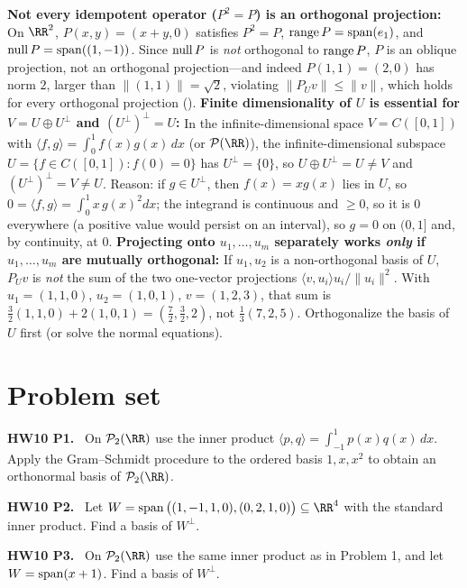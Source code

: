 \documentclass[10pt]{scrartcl}
\newcommand{\ip}[2]{\langle #1,#2\rangle}
\begin{document}
\begin{trapbox}
  \ii \textbf{Not every idempotent operator ($P^2=P$) is an orthogonal projection:} On $\RR^2$, $P(x,y)=(x+y,0)$ satisfies $P^2=P$, $\operatorname{range} P=\operatorname{span}(e_1)$, and $\operatorname{null} P=\operatorname{span}((1,-1))$. Since $\operatorname{null} P$ is \emph{not} orthogonal to $\operatorname{range} P$, $P$ is an oblique projection, not an orthogonal projection---and indeed $P(1,1)=(2,0)$ has norm $2$, larger than $\|(1,1)\|=\sqrt2$, violating $\|P_U v\|\le\|v\|$, which holds for every orthogonal projection ().
  \ii \textbf{Finite dimensionality of $U$ is essential for $V=U\oplus U^\perp$ and $(U^\perp)^\perp=U$:} In the infinite-dimensional space $V=C([0,1])$ with $\ip fg=\int_0^1 f(x)g(x)\,dx$ (or $\PP(\RR)$), the infinite-dimensional subspace $U=\{f\in C([0,1]):f(0)=0\}$ has $U^\perp=\{0\}$, so $U\oplus U^\perp=U\ne V$ and $(U^\perp)^\perp=V\ne U$. Reason: if $g\in U^\perp$, then $f(x)=xg(x)$ lies in $U$, so $0=\ip fg=\int_0^1x\,g(x)^2dx$; the integrand is continuous and $\ge0$, so it is $0$ everywhere (a positive value would persist on an interval), so $g=0$ on $(0,1]$ and, by continuity, at $0$.
  \ii \textbf{Projecting onto $u_1,\dots,u_m$ separately works \emph{only} if $u_1,\dots,u_m$ are mutually orthogonal:} If $u_1,u_2$ is a non-orthogonal basis of $U$, $P_U v$ is \emph{not} the sum of the two one-vector projections $\ip v{u_i}u_i/\|u_i\|^2$. With $u_1=(1,1,0)$, $u_2=(1,0,1)$, $v=(1,2,3)$, that sum is $\frac32(1,1,0)+2(1,0,1)=(\frac72,\frac32,2)$, not $\frac13(7,2,5)$. Orthogonalize the basis of $U$ first (or solve the normal equations).
\end{trapbox}

\section{Problem set}

\begin{prob}
\textbf{HW10 P1. }\ On $\PP_2(\RR)$ use the inner product $\ip pq=\int_{-1}^1p(x)q(x)\,dx$. Apply the Gram--Schmidt procedure to the ordered basis $1,x,x^2$ to obtain an orthonormal basis of $\PP_2(\RR)$.
\end{prob}

\begin{prob}
\textbf{HW10 P2. }\ Let $W=\spn\big((1,-1,1,0),(0,2,1,0)\big)\subseteq\RR^4$ with the standard inner product. Find a basis of $W^\perp$.
\end{prob}

\begin{prob}
\textbf{HW10 P3. }\ On $\PP_2(\RR)$ use the same inner product as in Problem 1, and let $W=\operatorname{span}(x+1)$. Find a basis of $W^\perp$.
\end{prob}
\end{document}
